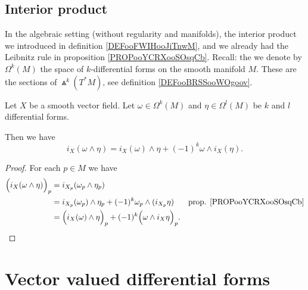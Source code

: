 \subsection{Interior product}

In the algebraic setting (without regularity and manifolds), the interior product we introduced in definition \ref{DEFooFWIHooJiTnwM}, and we already had the Leibnitz rule in proposition \ref{PROPooYCRXooSOsqCb}. Recall: the we denote by \( \Omega^k(M)\) the space of \( k\)-differential forms on the smooth manifold \( M\). These are the sections of \( \Wedge^k(T^*M)\), see definition \ref{DEFooBRSSooWOgoov}.

\begin{proposition}		\label{PROPooIQIUooTDNJdB}
	Let \( X\) be a smooth vector field. Let \( \omega\in \Omega^k(M)\) and \( \eta\in \Omega^l(M)\) be \( k\) and \( l\) differential forms.

	Then we have
	\begin{equation}
		i_X(\omega\wedge \eta)=i_X(\omega)\wedge \eta+(-1)^k\omega\wedge i_X(\eta).
	\end{equation}
\end{proposition}

\begin{proof}
	For each \( p\in M\) we have
	\begin{subequations}
		\begin{align}
			\Big( i_X(\omega\wedge \eta) \Big)_p & = i_{X_p}(\omega_p\wedge \eta_p)                                                                                         \\
			                                     & = i_{X_p}(\omega_p)\wedge\eta_p+(-1)^k\omega_p\wedge(i_{X_p}\eta)                & \text{prop. \ref{PROPooYCRXooSOsqCb}} \\
			                                     & = \Big( i_X(\omega)\wedge \eta \Big)_p+(-1)^k\Big( \omega\wedge i_X\eta \Big)_p.
		\end{align}
	\end{subequations}
\end{proof}


\section{Vector valued differential forms}	\label{SecVectValFiffFor}

